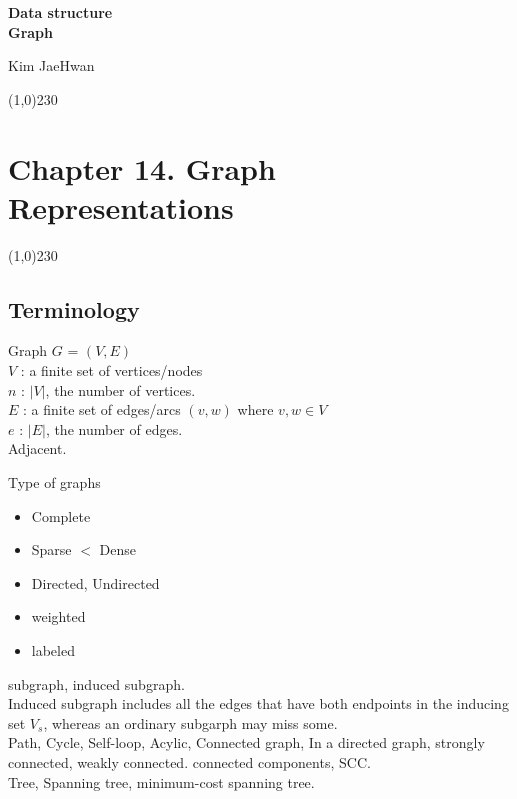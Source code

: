 \documentclass[twocolumn]{article}%
\theoremstyle{definition}
\begin{document}
\begin{center}
    \textbf{\LARGE{Data structure}} \\
    \textbf{\small{Graph}}
\end{center}

\begin{flushright}
    Kim JaeHwan
\end{flushright}

\begin{center}
\line(1,0){230}
\end{center}
\section*{Chapter 14. Graph Representations}
\begin{center}
\line(1,0){230}
\end{center}

\subsection*{Terminology}

Graph $G$ = $(V, E)$ \\
$V$ : a finite set of vertices/nodes\\$n$ : $|V|$, the number of vertices. \\
$E$ : a finite set of edges/arcs $(v, w)$ where $v, w \in V$\\ $e$ : $|E|$, the number of edges. \\

\bigskip\noindent
Adjacent.

\bigskip\noindent
Type of graphs
\begin{itemize}
    \item Complete
    \item Sparse $<$ Dense
    \item Directed, Undirected
    \item weighted
    \item labeled
\end{itemize}

\bigskip\noindent
subgraph, induced subgraph.\\
Induced subgraph includes all the edges that have both endpoints in the inducing set $V_s$, whereas an ordinary subgarph may miss some.\\

\bigskip\noindent
Path, Cycle, Self-loop, Acylic, Connected graph, In a directed graph, strongly connected, weakly connected. connected components, SCC.\\
Tree, Spanning tree, minimum-cost spanning tree.
\end{document}
